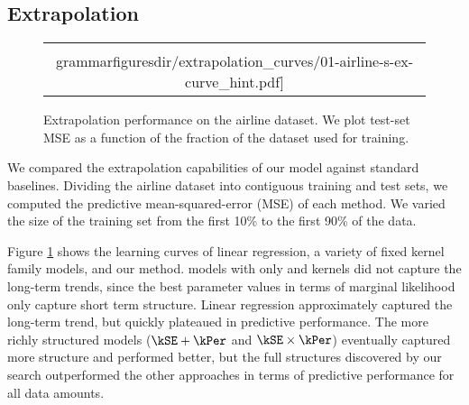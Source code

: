 \iffalse

\subsection{Extrapolation}

\begin{figure}
\centering
\begin{tabular}{c}
\hspace{-0.5cm}
\texttt{[image: \\grammarfiguresdir/extrapolation\_curves/01-airline-s-ex-curve\_hint.pdf]}
\end{tabular}
\caption[Comparison of extrapolation performance]
{Extrapolation performance on the airline dataset.  We plot test-set MSE as a function of the fraction of the dataset used for training. 
}
\label{fig:extrapolation}
\end{figure}

We compared the extrapolation capabilities of our model against standard baselines\footnotemark.
Dividing the airline dataset into contiguous training and test sets, we computed the predictive mean-squared-error (MSE) of each method.
We varied the size of the training set from the first 10\% to the first 90\% of the data.

Figure \ref{fig:extrapolation} shows the learning curves of linear regression, a variety of fixed kernel family \gp{} models, and our method.  
\gp{} models with only \kSE{} and \kPer{} kernels did not capture the long-term trends, since the best parameter values in terms of \gp{} marginal likelihood only capture short term structure. 
Linear regression approximately captured the long-term trend, but quickly plateaued in predictive performance.
The more richly structured \gp{} models (${\kSE + \kPer}$ and ${\kSE \times \kPer}$) eventually captured more structure and performed better, but the full structures discovered by our search outperformed the other approaches in terms of predictive performance for all data amounts.

